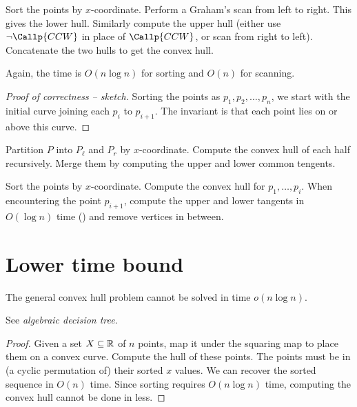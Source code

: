 \begin{solution}
    Sort the points by $x$-coordinate.
    Perform a Graham's scan from left to right.
    This gives the lower hull.
    Similarly compute the upper hull
    (either use $\neg \Callp{CCW}$ in place of $\Callp{CCW}$, or
    scan from right to left).
    Concatenate the two hulls to get the convex hull.

    Again, the time is $O(n \log n)$ for sorting and $O(n)$ for scanning.
\end{solution}

\begin{proof}[Proof of correctness -- sketch]
    Sorting the points as $p_1, p_2, \dots, p_n$, we start with the initial
    curve joining each $p_i$ to $p_{i+1}$.
    The invariant is that each point lies on or above this curve.
\end{proof}

\begin{solution}
    Partition $P$ into $P_\ell$ and $P_r$ by $x$-coordinate.
    Compute the convex hull of each half recursively.
    Merge them by computing the upper and lower common tengents.
    \TODO[Exercise]
\end{solution}

\begin{solution}[Incremental]
    Sort the points by $x$-coordinate.
    Compute the convex hull for $p_1, \dots, p_i$.
    When encountering the point $p_{i+1}$, compute the upper and lower
    tangents in $O(\log n)$ time (\TODO[exercise]) and remove vertices in
    between.
\end{solution}

\section{Lower time bound} \label{sec:hull:lower-bound}
\begin{theorem}
    The general convex hull problem cannot be solved in time $o(n \log n)$.
\end{theorem}
See \emph{algebraic decision tree}.
\begin{proof}
    Given a set $X \subseteq \mathbb{R}$ of $n$ points, map it under the squaring
    map to place them on a convex curve.
    Compute the hull of these points.
    The points must be in (a cyclic permutation of) their sorted $x$ values.
    We can recover the sorted sequence in $O(n)$ time.
    Since sorting requires $O(n \log n)$ time, computing the convex hull
    cannot be done in less.
\end{proof}

